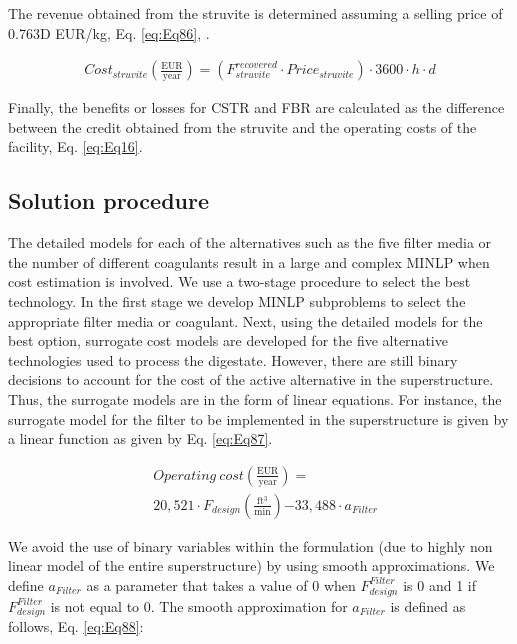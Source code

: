 \begin{refsection}[referencesCh2]
The revenue obtained from the struvite is determined assuming a selling price of 0.763D EUR/kg, Eq. \ref{eq:Eq86}, \citep{molinos2011economic}.

\begin{align}
	Cost_{struvite} \left( \frac{\text{EUR}}{\text{year}} \right) = \left( F_{struvite}^{recovered}\cdot{Price}_{struvite} \right) \cdot 3600\cdot h \cdot d \label{eq:Eq86}
\end{align}

Finally, the benefits or losses for CSTR and FBR are calculated as the difference between the credit obtained from the struvite and the operating costs of the facility, Eq. \ref{eq:Eq16}.


\subsection{Solution procedure} \label{section:SolutionProcedure}
The detailed models for each of the alternatives such as the five filter media or the number of different coagulants result in a large and complex MINLP when cost estimation is involved. We use a two-stage procedure to select the best technology. In the first stage we develop MINLP subproblems to select the appropriate filter media or coagulant. Next, using the detailed models for the best option, surrogate cost models are developed for the five alternative technologies used to process the digestate. However, there are still binary decisions to account for the cost of the active alternative in the superstructure. Thus, the surrogate models are in the form of linear equations. For instance, the surrogate model for the filter to be implemented in the superstructure is given by a linear function as given by Eq. \ref{eq:Eq87}.

\begin{align}
	&{Operating \ cost} \left( \frac{\text{EUR}}{\text{year}} \right) =  \label{eq:Eq87} \\
	& 20,521 \cdot F_{design} \left( \frac{\text{ft}{^3}}{\text{min}} \right) { -33,488} \cdot {a}_{Filter} \nonumber
\end{align}

We avoid the use of binary variables within the formulation (due to highly non linear model of the entire superstructure) by using smooth approximations. We define $a_{Filter}$ as a parameter that takes a value of 0 when $F_{design}^{Filter}$ is 0 and 1 if $F_{design}^{Filter}$ is not equal to 0. The smooth approximation for $a_{Filter}$ is defined as follows, Eq. \ref{eq:Eq88}:


\end{refsection}
